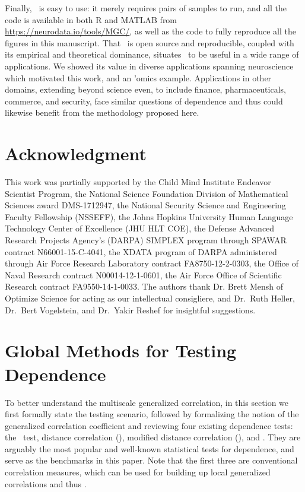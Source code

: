 \documentclass[11pt]{extarticle}
\begin{document}
Finally, \Mgc~is easy to use: it merely requires pairs of samples to run, and all the code is available in both R and MATLAB from \url{https://neurodata.io/tools/MGC/}, as well as the code to fully reproduce all the figures in this manuscript.  That \Mgc~is open source and reproducible, coupled with its empirical and theoretical dominance, situates \Mgc~to be useful in a wide range of applications.  We showed its value in  diverse applications spanning neuroscience  which motivated this work, and an 'omics example. Applications in other domains, extending beyond science even, to include finance, pharmaceuticals, commerce, and security, face similar questions of dependence and thus could likewise benefit from the methodology proposed here.

\clearpage
\pagestyle{empty}




\section*{Acknowledgment}
This work was partially supported by
the Child Mind Institute Endeavor Scientist Program,
%
the National Science Foundation Division of Mathematical Sciences award DMS-1712947,
%
the National Security Science and Engineering Faculty Fellowship (NSSEFF),
%
the Johns Hopkins University Human Language Technology Center of Excellence (JHU HLT COE),
%
the Defense Advanced Research Projects Agency's (DARPA) SIMPLEX program through SPAWAR contract N66001-15-C-4041,
%
the XDATA program of DARPA administered through Air Force Research Laboratory contract FA8750-12-2-0303,
%
the Office of Naval Research contract N00014-12-1-0601,
%
the Air Force Office of Scientific Research contract FA9550-14-1-0033.
%
The authors thank Dr. Brett Mensh of Optimize Science for acting as our intellectual consigliere, and Dr.~Ruth Heller, Dr.~Bert Vogelstein,  and Dr.~Yakir Reshef for insightful suggestions.

\clearpage
\appendix
\setcounter{figure}{0}
\renewcommand{\thealgorithm}{C\arabic{algorithm}}
\renewcommand{\thefigure}{E\arabic{figure}}
\renewcommand{\thesubsection}{\thesection.\Roman{subsection}}
\renewcommand{\thesubsubsection}{\thesubsection.\arabic{subsubsection}}

\section{Global Methods for Testing Dependence}
\label{appen:global}
To better understand the multiscale generalized correlation, in this section we first formally state the testing scenario, followed by formalizing the notion of the generalized correlation coefficient and reviewing four existing dependence tests: the \Mantel~test, distance correlation (\Dcorr), modified distance correlation (\Mcorr), and \Hhg. They are arguably the most popular and well-known statistical tests for dependence, and serve as the benchmarks in this paper. Note that the first three are conventional correlation measures, which can be used for building up local generalized correlations and thus \Mgc.
\end{document}

